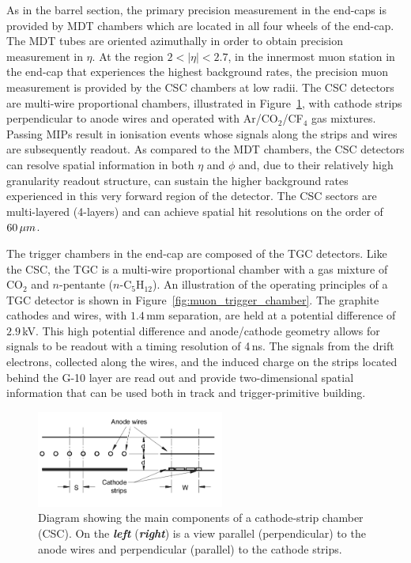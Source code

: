 As in the barrel section, the primary precision measurement in the end-caps is provided
by MDT chambers which are located in all four wheels of the end-cap.
The MDT tubes are oriented azimuthally in order to obtain precision measurement in $\eta$.
At the region $2 < \lvert \eta \rvert < 2.7$, in the innermost muon station
in the end-cap that experiences the highest background rates,
the precision muon measurement is provided by the CSC chambers at low radii.
The CSC detectors are multi-wire proportional chambers, illustrated in Figure~\ref{fig:csc_chamber},
with cathode strips perpendicular to anode wires and operated with Ar/CO$_2$/CF$_4$ gas mixtures.
Passing MIPs result in ionisation events whose signals along the strips and wires are
subsequently readout.
As compared to the MDT chambers, the CSC detectors can resolve spatial information in both $\eta$ and $\phi$
and, due to their relatively high granularity readout structure, can sustain the higher
background rates experienced in this very forward region of the detector.
The CSC sectors are multi-layered (4-layers) and can achieve spatial hit resolutions on the order
of $60\,\mu m$.

The trigger chambers in the end-cap are composed of the TGC detectors.
Like the CSC, the TGC is a multi-wire proportional chamber with a gas mixture
of CO$_2$ and $n$-pentante ($n$-C$_5$H$_{12}$).
An illustration of the operating principles of a TGC detector is shown in Figure~\ref{fig:muon_trigger_chamber}.
The graphite cathodes and wires, with $1.4$\,mm separation, are held at a potential
difference of $2.9$\,kV.
This high potential difference and anode/cathode geometry allows for signals to be readout
with a timing resolution of 4\,ns.
The signals from the drift electrons, collected along the wires, and the induced
charge on the strips located behind the G-10 layer are read out and provide
two-dimensional spatial information that can be used both in track and trigger-primitive building.


\begin{figure}[!htb]
    \begin{center}
        \includegraphics[width=0.55\textwidth]{figures/chapter2/muon_spec/csc_chamber}
        \caption{
            Diagram showing the main components of a cathode-strip chamber (CSC).
            On the \textbf{\textit{left}} (\textbf{\textit{right}}) is a view parallel (perpendicular) to the anode
            wires and perpendicular (parallel) to the cathode strips.
        }
        \label{fig:csc_chamber}
    \end{center}
\end{figure}


